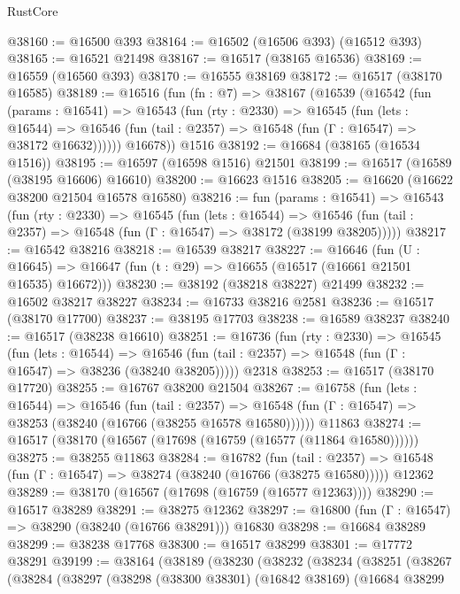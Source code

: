 \begin{lexlean}{RustCore}
\begin{coremodule}
@38160 := @16500 @393
@38164 := @16502 (@16506 @393) (@16512 @393)
@38165 := @16521 @21498
@38167 := @16517 (@38165 @16536)
@38169 := @16559 (@16560 @393)
@38170 := @16555 @38169
@38172 := @16517 (@38170 @16585)
@38189 := @16516
    (fun (fn : @7) =>
    @38167
      (@16539
        (@16542
          (fun (params : @16541) =>
          @16543
            (fun (rty : @2330) =>
            @16545
              (fun (lets : @16544) =>
              @16546 (fun (tail : @2357) => @16548 (fun (Γ : @16547) => @38172 @16632))))))
        @16678))
    @1516
@38192 := @16684 (@38165 (@16534 @1516))
@38195 := @16597 (@16598 @1516) @21501
@38199 := @16517 (@16589 (@38195 @16606) @16610)
@38200 := @16623 @1516
@38205 := @16620 (@16622 @38200 @21504 @16578 @16580)
@38216 := fun (params : @16541) =>
  @16543
    (fun (rty : @2330) =>
    @16545
      (fun (lets : @16544) =>
      @16546 (fun (tail : @2357) => @16548 (fun (Γ : @16547) => @38172 (@38199 @38205)))))
@38217 := @16542 @38216
@38218 := @16539 @38217
@38227 := @16646
    (fun (U : @16645) => @16647 (fun (t : @29) => @16655 (@16517 (@16661 @21501 @16535) @16672)))
@38230 := @38192 (@38218 @38227) @21499
@38232 := @16502 @38217 @38227
@38234 := @16733 @38216 @2581
@38236 := @16517 (@38170 @17700)
@38237 := @38195 @17703
@38238 := @16589 @38237
@38240 := @16517 (@38238 @16610)
@38251 := @16736
    (fun (rty : @2330) =>
    @16545
      (fun (lets : @16544) =>
      @16546 (fun (tail : @2357) => @16548 (fun (Γ : @16547) => @38236 (@38240 @38205)))))
    @2318
@38253 := @16517 (@38170 @17720)
@38255 := @16767 @38200 @21504
@38267 := @16758
    (fun (lets : @16544) =>
    @16546
      (fun (tail : @2357) =>
      @16548 (fun (Γ : @16547) => @38253 (@38240 (@16766 (@38255 @16578 @16580))))))
    @11863
@38274 := @16517 (@38170 (@16567 (@17698 (@16759 (@16577 (@11864 @16580))))))
@38275 := @38255 @11863
@38284 := @16782
    (fun (tail : @2357) => @16548 (fun (Γ : @16547) => @38274 (@38240 (@16766 (@38275 @16580)))))
    @12362
@38289 := @38170 (@16567 (@17698 (@16759 (@16577 @12363))))
@38290 := @16517 @38289
@38291 := @38275 @12362
@38297 := @16800 (fun (Γ : @16547) => @38290 (@38240 (@16766 @38291))) @16830
@38298 := @16684 @38289
@38299 := @38238 @17768
@38300 := @16517 @38299
@38301 := @17772 @38291
@39199 := @38164
    (@38189
      (@38230
        (@38232
          (@38234
            (@38251
              (@38267
                (@38284
                  (@38297
                    (@38298
                      (@38300 @38301)
                      (@16842 @38169)
                      (@16684
                        @38299

\end{coremodule}
\end{lexlean}

